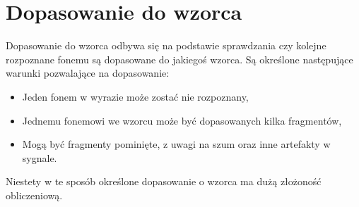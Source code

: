 \section{Dopasowanie do wzorca}
\label{sec:dopasowanie}

Dopasowanie do wzorca odbywa się na podstawie sprawdzania czy kolejne rozpoznane fonemu są dopasowane do jakiegoś wzorca. Są określone następujące warunki pozwalające na dopasowanie:
\begin{itemize}
    \item Jeden fonem w wyrazie może zostać nie rozpoznany,
    \item Jednemu fonemowi we wzorcu może być dopasowanych kilka fragmentów,
    \item Mogą być fragmenty pominięte, z uwagi na szum oraz inne artefakty w sygnale.
\end{itemize}

Niestety w te sposób określone dopasowanie o wzorca ma dużą złożoność obliczeniową.
